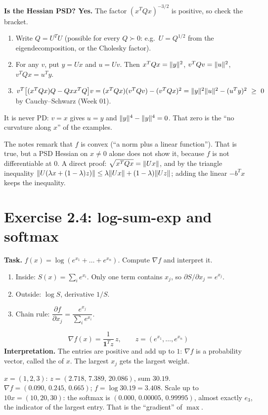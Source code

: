 \textbf{Is the Hessian PSD? Yes.} The factor $(x^TQx)^{-3/2}$ is positive, so check the bracket.
\begin{enumerate}
  \item Write $Q=U^TU$ (possible for every $Q\succ0$: e.g.\ $U=Q^{1/2}$ from the eigendecomposition, or the Cholesky factor).
  \item For any $v$, put $y=Ux$ and $u=Uv$. Then $x^TQx=\lVert y\rVert^2$, $v^TQv=\lVert u\rVert^2$, $v^TQx=u^Ty$.
  \item $v^T\big[(x^TQx)Q-Qxx^TQ\big]v=(x^TQx)(v^TQv)-(v^TQx)^2=\lVert y\rVert^2\lVert u\rVert^2-(u^Ty)^2\ \ge\ 0$ by Cauchy--Schwarz (Week 01).
\end{enumerate}
It is never PD: $v=x$ gives $u=y$ and $\lVert y\rVert^4-\lVert y\rVert^4=0$. That zero is the ``no curvature along $x$'' of the examples.

\begin{pitfall}
The notes remark that $f$ is convex (``a norm plus a linear function''). That is true, but a PSD Hessian on $x\ne0$ alone does not show it, because $f$ is not differentiable at $0$.
A direct proof: $\sqrt{x^TQx}=\lVert Ux\rVert$, and by the triangle inequality $\lVert U(\lambda x+(1-\lambda)z)\rVert\le\lambda\lVert Ux\rVert+(1-\lambda)\lVert Uz\rVert$; adding the linear $-b^Tx$ keeps the inequality.
\end{pitfall}

\section{Exercise 2.4: log-sum-exp and softmax \lvl{$\bullet\bullet\circ$}}

\textbf{Task.} $f(x)=\log(e^{x_1}+\dots+e^{x_n})$. Compute $\nabla f$ and interpret it.
\begin{enumerate}
  \item Inside: $S(x)=\sum_ie^{x_i}$. Only one term contains $x_j$, so $\partial S/\partial x_j=e^{x_j}$.
  \item Outside: $\log S$, derivative $1/S$.
  \item Chain rule: $\dfrac{\partial f}{\partial x_j}=\dfrac{e^{x_j}}{\sum_ie^{x_i}}$.
\end{enumerate}
\[ \boxed{\ \nabla f(x)=\frac{1}{\mathbf1^Tz}\,z,\qquad z=(e^{x_1},\dots,e^{x_n})\ } \]
\textbf{Interpretation.} The entries are positive and add up to $1$: $\nabla f$ is a probability vector, called the  of $x$. The largest $x_j$ gets the largest weight.

\begin{example}
$x=(1,2,3)$: $z=(2.718,\,7.389,\,20.086)$, sum $30.19$. $\nabla f=(0.090,\,0.245,\,0.665)$; $f=\log30.19=3.408$.
Scale up to $10x=(10,20,30)$: the softmax is $(0.000,\,0.00005,\,0.99995)$, almost exactly $e_3$, the indicator of the largest entry. That is the ``gradient'' of $\max$.
\end{example}

